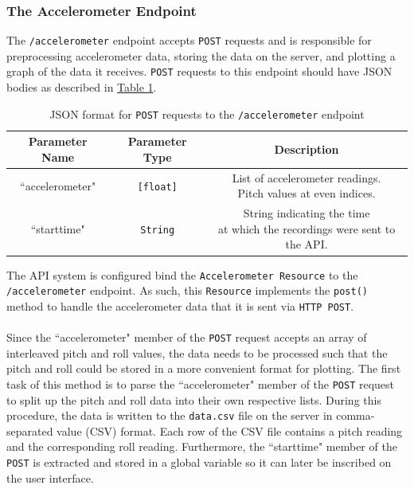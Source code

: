 \subsubsection{The Accelerometer Endpoint}
The \texttt{/accelerometer} endpoint accepts \texttt{POST} requests and is responsible for
preprocessing accelerometer data, storing the data on the server, and plotting a graph of the data
it receives. \texttt{POST} requests to this endpoint should have JSON bodies as described in
\hyperref[tab:accjson]{Table \ref{tab:accjson}}.
\begin{table}[h]
	\caption{JSON format for \texttt{POST} requests to the \texttt{/accelerometer}
	endpoint}\label{tab:accjson}
	\begin{center}
		\begin{tabular}{|c|c|c|}
			\hline
			\textbf{Parameter Name} & \textbf{Parameter Type} & \textbf{Description}\\\hline
			``accelerometer" & \texttt{[float]} & \shortstack[c]{List of accelerometer readings.\\Pitch values at
			even indices.} \\\hline
			``starttime" & \texttt{String} & \shortstack{String indicating the time\\at which the
			recordings were sent to the API.}\\\hline
		\end{tabular}
	\end{center}
\end{table}
The API system is configured bind the \texttt{Accelerometer Resource} to the \texttt{/accelerometer}
endpoint. As such, this \texttt{Resource} implements the \texttt{post()} method to handle the
accelerometer data that it is sent via \texttt{HTTP POST}.\\\\
Since the ``accelerometer" member of the \texttt{POST} request accepts an array of interleaved pitch and
roll values, the data needs to be processed such that the pitch and roll could be stored in a more
convenient format for plotting. The first task of this method is to parse the ``accelerometer"
member of the \texttt{POST} request to split up the pitch and roll data into their own respective
lists. During this procedure, the data is written to the \texttt{data.csv} file on the server in
comma-separated value (CSV) format. Each row of the CSV file contains a pitch reading and the
corresponding roll reading. Furthermore, the ``starttime" member of the \texttt{POST} is extracted
and stored in a global variable so it can later be inscribed on the user interface.\\\\
